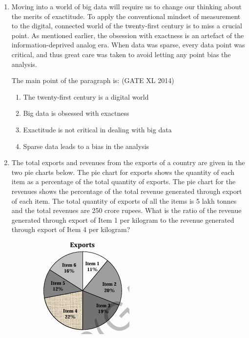 \documentclass[journal,12pt,onecolumn]{IEEEtran}
\theoremstyle{remark}
\begin{document}
\begin{enumerate}
    \item Moving into a world of big data will require us to change our thinking about the merits of exactitude. To apply the conventional mindset of measurement to the digital, connected world of the twenty-first century is to miss a crucial point. As mentioned earlier, the obsession with exactness is an artefact of the information-deprived analog era. When data was sparse, every data point was critical, and thus great care was taken to avoid letting any point bias the analysis.
    \par
    The main point of the paragraph is:
    \hfill (GATE XL 2014)\\
        \begin{enumerate}
            \item The twenty-first century is a digital world
            \item Big data is obsessed with exactness
            \item Exactitude is not critical in dealing with big data
            \item Sparse data leads to a bias in the analysis
        \end{enumerate}
\vspace{0.2cm}
    \item The total exports and revenues from the exports of a country are given in the two pie charts below. The pie chart for exports shows the quantity of each item as a percentage of the total quantity of exports. The pie chart for the revenues shows the percentage of the total revenue generated through export of each item. The total quantity of exports of all the items is 5 lakh tonnes and the total revenues are 250 crore rupees. What is the ratio of the revenue generated through export of Item 1 per kilogram to the revenue generated through export of Item 4 per kilogram?
\begin{figure}[H]
    \centering
    \begin{minipage}{0.45\textwidth}
    \centering   
    \includegraphics[width=0.5\columnwidth]{fig1.png}

\end{minipage}
\end{figure}
\end{enumerate}
\end{document}
